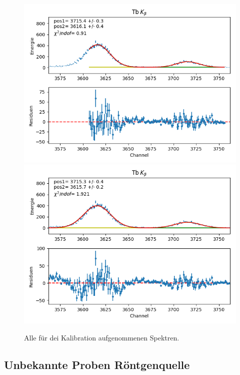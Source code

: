 \documentclass[12pt,a4paper]{article}
\begin{document}
\begin{figure}[H]
\centering
\includegraphics[scale=0.8]{Bilder/alpha/tb_beta_1.png}
\includegraphics[scale=0.8]{Bilder/alpha/tb_beta_2.png}
\caption{Alle für dei Kalibration aufgenommenen Spektren.}
\label{fig:kal_alles}
\end{figure}

\subsection{Unbekannte Proben Röntgenquelle}
\end{document}

